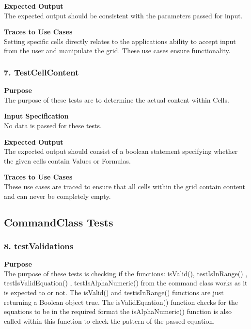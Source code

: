 \documentclass[12pt]{article}
\begin{document}
\noindent
{\bf Expected Output}\\
The expected output should be consistent with the parameters passed for input. 

\noindent
{\bf Traces to Use Cases}\\
Setting specific cells directly relates to the applications ability to accept input from the user and manipulate the grid. These use cases ensure functionality.

\subsubsection{7. TestCellContent} \label{tc:1}

\noindent
{\bf Purpose}\\
The purpose of these tests are to determine the actual content within Cells. 

\noindent
{\bf Input Specification}\\
No data is passed for these tests. 

\noindent
{\bf Expected Output}\\
The expected output should consist of a boolean statement specifying whether the given cells contain Values or Formulas. 

\noindent
{\bf Traces to Use Cases}\\
These use cases are traced to ensure that all cells within the grid contain content and can never be completely empty. 

\subsection{CommandClass Tests}

\subsubsection{8. testValidations} \label{tc:1}

\noindent
{\bf Purpose}\\
The purpose of these tests is checking if the functions: isValid(), testIsInRange() , testIsValidEquation() , testIsAlphaNumeric() from the command class works as it is expected to or not. The isValid() and testisInRange() functions are just returning a Boolean object true. The isValidEquation() function checks for the equations to be in the required format the isAlphaNumeric() function is also called within this function to check the pattern of the passed equation. 
\end{document}
